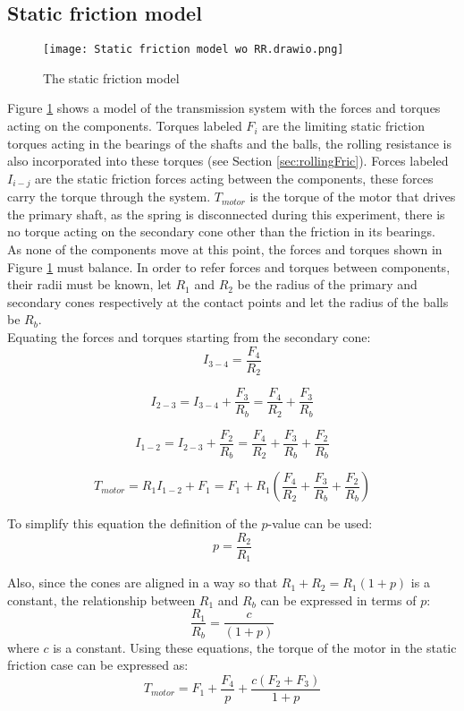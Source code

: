 \documentclass[12pt]{article}
\begin{document}
\subsection{Static friction model}




\begin{figure}[h]
    \centering
    \texttt{[image: Static friction model wo RR.drawio.png]}
    \caption{The static friction model}
    \label{fig:staticFricModel}
\end{figure}

Figure \ref{fig:staticFricModel} shows a model of the transmission system with the forces and torques acting on the components. Torques labeled $F_i$ are the limiting static friction torques acting in the bearings of the shafts and the balls, the rolling resistance is also incorporated into these torques (see Section \ref{sec:rollingFric}). Forces labeled $I_{i-j}$ are the static friction forces acting between the components, these forces carry the torque through the system. $T_{motor}$ is the torque of the motor that drives the primary shaft, as the spring is disconnected during this experiment, there is no torque acting on the secondary cone other than the friction in its bearings. \\

As none of the components move at this point, the forces and torques shown in Figure \ref{fig:staticFricModel} must balance. In order to refer forces and torques between components, their radii must be known, let $R_1$ and $R_2$ be the radius of the primary and secondary cones  respectively at the contact points and let the radius of the balls be $R_b.$\\

Equating the forces and torques starting from the secondary cone:\\

$$I_{3-4} = \frac{F_4}{R_2}$$

$$I_{2-3} = I_{3-4}  + \frac{F_3}{R_b} = \frac{F_4}{R_2} + \frac{F_3}{R_b}$$

$$I_{1-2} = I_{2-3} + \frac{F_2}{R_b} = \frac{F_4}{R_2} + \frac{F_3}{R_b}  + \frac{F_2}{R_b}$$

$$T_{motor} = R_1 I_{1-2} + F_1 = F_1 + R_1 \left(\frac{F_4}{R_2}  + \frac{F_3}{R_b}  + \frac{F_2}{R_b} \right) $$

To simplify this equation the definition of the $p$-value can be used:
$$p=\frac{R_2}{R_1}$$

Also, since the cones are aligned in a way so that $R_1+R_2 = R_1(1+p)$ is a constant, the relationship between $R_1$ and $R_b$ can be expressed in terms of $p$:
$$\frac{R_1}{R_b} = \frac{c}{(1+p)}$$
where $c$ is a constant.
Using these equations, the torque of the motor in the static friction case can be expressed as:
$$T_{motor} = F_1 + \frac{F_4}{p} + \frac{c(F_2+F_3)}{1+p}$$
\end{document}
